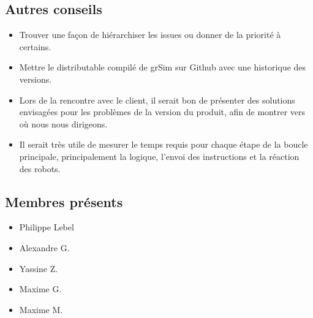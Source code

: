 \documentclass[12pt,letterpaper,twoside]{article}
\begin{document}
\subsection*{Autres conseils}
\begin{itemize}
	\item Trouver une façon de hiérarchiser les issues ou donner de la priorité à certains.
	\item Mettre le distributable compilé de grSim sur Github avec une historique des versions.
	\item Lors de la rencontre avec le client, il serait bon de présenter des solutions envisagées pour les problèmes de la version du produit, afin de montrer vers où nous nous dirigeons.
	\item Il serait très utile de mesurer le temps requis pour chaque étape de la boucle principale, principalement la logique, l'envoi des instructions et la réaction des robots.
\end{itemize}

\subsection*{Membres présents}
\begin{itemize}
\item Philippe Lebel
\item Alexandre G.
\item Yassine Z.
\item Maxime G.
\item Maxime M.
\end{itemize}
\end{document}
